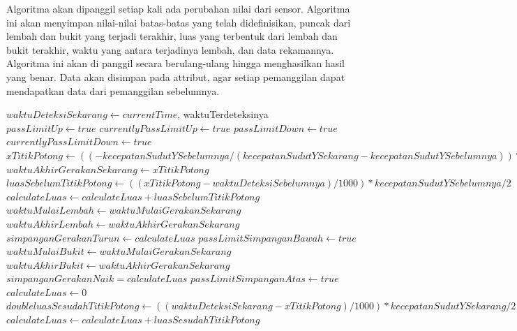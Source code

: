 \documentclass[a4paper,twoside]{article}
\begin{document}
\begin{enumerate}
Algoritma akan dipanggil setiap kali ada perubahan nilai dari sensor. Algoritma ini akan menyimpan nilai-nilai batas-batas yang telah didefinisikan, puncak dari lembah dan bukit yang terjadi terakhir, luas yang terbentuk dari lembah dan bukit terakhir, waktu yang antara terjadinya lembah, dan data rekamannya. Algoritma ini akan di panggil secara berulang-ulang hingga menghasilkan hasil yang benar. Data akan disimpan pada attribut, agar setiap pemanggilan dapat mendapatkan data dari pemanggilan sebelumnya. 

\begin{algorithm}
	\caption{Algoritma Pendeteksi Anggukkan}
	\label{alg:algoritma-pendeteksi-anggukkan}
	\begin{algorithmic}[1]
		\State $waktuDeteksiSekarang \gets currentTime$, waktuTerdeteksinya
			\State $passLimitUp \gets true$
			\State $currentlyPassLimitUp \gets true$
			\State $passLimitDown \gets true$
			\State $currentlyPassLimitDown \gets true$
		\EndIf
			\State $xTitikPotong \gets ((-kecepatanSudutYSebelumnya / (kecepatanSudutYSekarang - kecepatanSudutYSebelumnya)) * (waktuDeteksiSekarang - waktuDeteksiSebelumnya))$
			\State $waktuAkhirGerakanSekarang \gets xTitikPotong$
			\State $luasSebelumTitikPotong \gets ((xTitikPotong - waktuDeteksiSebelumnya) / 1000) * kecepatanSudutYSebelumnya / 2$
			\State $calculateLuas \gets calculateLuas + luasSebelumTitikPotong$
				\State $waktuMulaiLembah \gets waktuMulaiGerakanSekarang$
				\State $waktuAkhirLembah \gets waktuAkhirGerakanSekarang$
				\State $simpanganGerakanTurun \gets calculateLuas$
					\State $passLimitSimpanganBawah \gets true$
				\EndIf
				\State $waktuMulaiBukit \gets waktuMulaiGerakanSekarang$
				\State $waktuAkhirBukit \gets waktuAkhirGerakanSekarang$
				\State $simpanganGerakanNaik = calculateLuas$
					\State $passLimitSimpanganAtas \gets true$
				\EndIf
			\EndIf
			\State $calculateLuas \gets 0$
			\State $double luasSesudahTitikPotong \gets ((waktuDeteksiSekarang - xTitikPotong) / 1000) * kecepatanSudutYSekarang / 2$ 
			\State $calculateLuas \gets calculateLuas + luasSesudahTitikPotong$ 

\end{algorithmic}
\end{algorithm}
\end{enumerate}
\end{document}
